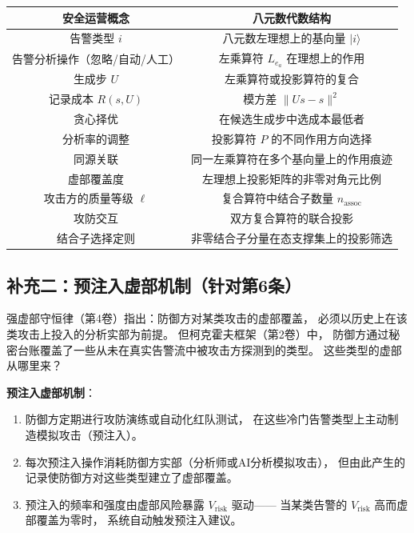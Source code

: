 \documentclass[11pt,a4paper]{article}
\begin{document}
\begin{center}
\begin{tabular}{c|c}
\toprule
\textbf{安全运营概念} & \textbf{八元数代数结构} \\
\midrule
告警类型 $i$ & 八元数左理想上的基向量 $|i\rangle$ \\
告警分析操作（忽略/自动/人工） & 左乘算符 $L_{e_a}$ 在理想上的作用 \\
生成步 $U$ & 左乘算符或投影算符的复合 \\
记录成本 $R(s,U)$ & 模方差 $\|U s - s\|^2$ \\
贪心择优 & 在候选生成步中选成本最低者 \\
分析率的调整 & 投影算符 $P$ 的不同作用方向选择 \\
同源关联 & 同一左乘算符在多个基向量上的作用痕迹 \\
虚部覆盖度 & 左理想上投影矩阵的非零对角元比例 \\
攻击方的质量等级 $\ell$ & 复合算符中结合子数量 $n_{\text{assoc}}$ \\
攻防交互 & 双方复合算符的联合投影 \\
结合子选择定则 & 非零结合子分量在态支撑集上的投影筛选 \\
\bottomrule
\end{tabular}
\end{center}

\subsection{补充二：预注入虚部机制（针对第6条）}

强虚部守恒律（第4卷）指出：防御方对某类攻击的虚部覆盖，
必须以历史上在该类攻击上投入的分析实部为前提。
但柯克霍夫框架（第2卷）中，
防御方通过秘密台账覆盖了一些从未在真实告警流中被攻击方探测到的类型。
这些类型的虚部从哪里来？

\textbf{预注入虚部机制}：
\begin{enumerate}[label=(\arabic*)]
    \item 防御方定期进行攻防演练或自动化红队测试，
          在这些冷门告警类型上主动制造模拟攻击（预注入）。
    \item 每次预注入操作消耗防御方实部（分析师或AI分析模拟攻击），
          但由此产生的记录使防御方对这些类型建立了虚部覆盖。
    \item 预注入的频率和强度由虚部风险暴露 $V_{\text{risk}}$ 驱动——
          当某类告警的 $V_{\text{risk}}$ 高而虚部覆盖为零时，
          系统自动触发预注入建议。
\end{enumerate}
\end{document}
